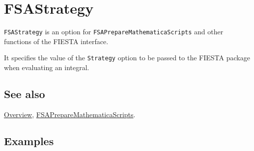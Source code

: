 \documentclass[../FeynHelpersManual.tex]{subfiles}
\begin{document}
\hypertarget{fsastrategy}{
\section{FSAStrategy}\label{fsastrategy}}

\texttt{FSAStrategy} is an option for
\texttt{FSAPrepareMathematicaScripts} and other functions of the FIESTA
interface.

It specifies the value of the \texttt{Strategy} option to be passed to
the FIESTA package when evaluating an integral.

\subsection{See also}

\hyperlink{toc}{Overview},
\hyperlink{fsapreparemathematicascripts}{FSAPrepareMathematicaScripts}.

\subsection{Examples}
\end{document}
